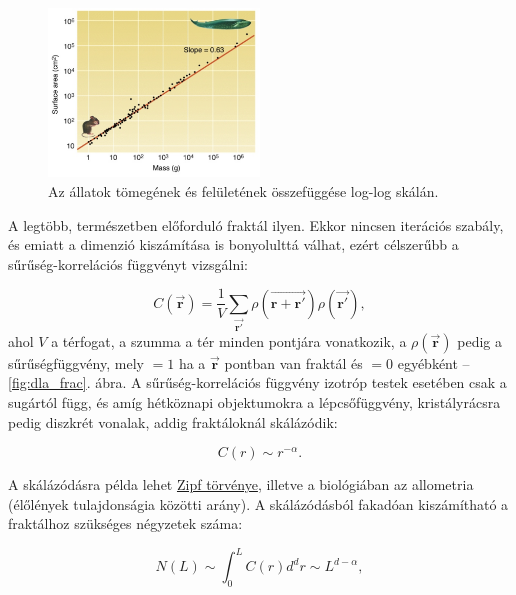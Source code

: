 \documentclass[12pt]{article}
\theoremstyle{plain}
\begin{document}
\begin{figure}[H]
    \begin{center}
    \includegraphics[width=0.5\textwidth]{media/allometry.png}
    \caption{Az állatok tömegének és felületének összefüggése log-log skálán.}
    \label{fig:allometry}
    \end{center}
\end{figure}

A legtöbb, természetben előforduló fraktál ilyen. Ekkor nincsen iterációs szabály, és emiatt a dimenzió kiszámítása is bonyolulttá válhat, ezért célszerűbb a sűrűség-korrelációs függvényt vizsgálni:

\begin{equation}
C\left( \vec{\mathbf{r}} \right) = \frac{1}{V} \sum_{\vec{\mathbf{r'}}} \rho \left(\vec{\mathbf{r + r'}} \right)\rho \left(\vec{\mathbf{r'}} \right),
\end{equation}
ahol $V$ a térfogat, a szumma a tér minden pontjára vonatkozik, a $\rho \left(\vec{\mathbf{r}} \right)$ pedig a sűrűségfüggvény, mely $=1$ ha a $\vec{\mathbf{r}} $ pontban van fraktál és $=0$ egyébként -- \ref{fig:dla_frac}. ábra. A sűrűség-korrelációs függvény izotróp testek esetében csak a sugártól függ, és amíg hétköznapi objektumokra a lépcsőfüggvény, kristályrácsra pedig diszkrét vonalak, addig fraktáloknál skálázódik:

\begin{equation}
C\left(r\right) \sim r^{-\alpha}.
\end{equation}

A skálázódásra példa lehet \href{https://en.wikipedia.org/wiki/Zipf's_law}{Zipf törvénye}, illetve a biológiában az allometria (élőlények tulajdonságia közötti arány). A skálázódásból fakadóan kiszámítható a fraktálhoz szükséges négyzetek száma:

\begin{equation}
N \left( L \right)  \sim \int_0^L C \left( r \right) d^dr \sim L^{d-\alpha},
\end{equation}
\end{document}
